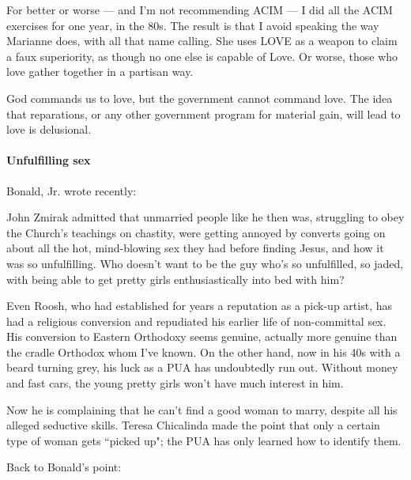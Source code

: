 For better or worse — and I'm not recommending ACIM — I did all the ACIM exercises for one year, in the 80s. The result is that I avoid speaking the way Marianne does, with all that name calling. She uses LOVE as a weapon to claim a faux superiority, as though no one else is capable of Love. Or worse, those who love gather together in a partisan way.

God commands us to love, but the government cannot command love. The idea that reparations, or any other government program for material gain, will lead to love is delusional.

\paragraph{Unfulfilling sex}
Bonald, Jr. wrote recently:

\begin{quotex}
John Zmirak admitted that unmarried people like he then was, struggling to obey the Church's teachings on chastity, were getting annoyed by converts going on about all the hot, mind-blowing sex they had before finding Jesus, and how it was so unfulfilling. Who doesn't want to be the guy who's so unfulfilled, so jaded, with being able to get pretty girls enthusiastically into bed with him? 

\end{quotex}
Even Roosh, who had established for years a reputation as a pick-up artist, has had a religious conversion and repudiated his earlier life of non-committal sex. His conversion to Eastern Orthodoxy seems genuine, actually more genuine than the cradle Orthodox whom I've known. On the other hand, now in his 40s with a beard turning grey, his luck as a PUA has undoubtedly run out. Without money and fast cars, the young pretty girls won't have much interest in him.

Now he is complaining that he can't find a good woman to marry, despite all his alleged seductive skills. Teresa Chicalinda made the point that only a certain type of woman gets ``picked up"; the PUA has only learned how to identify them.

Back to Bonald's point:

